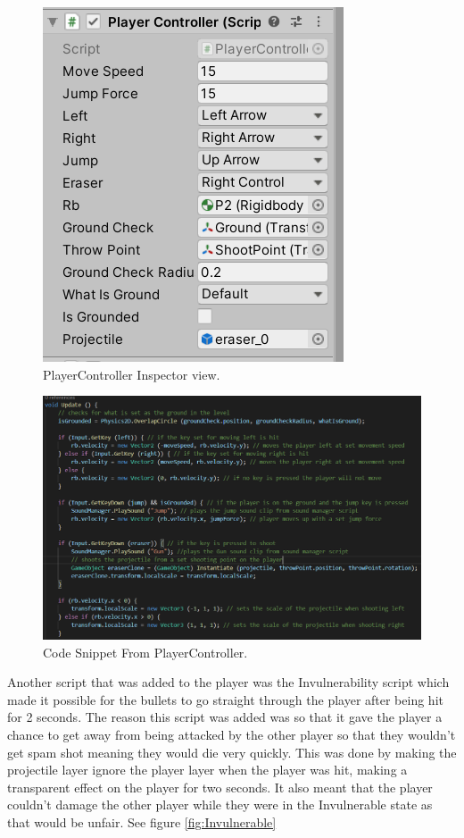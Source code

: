 \begin{figure}[h]
\centering
  \includegraphics[width= 0.4\linewidth]{Images/PlayerControllerInspector.PNG}
  \caption{PlayerController Inspector view.}
  \label{fig:PlayerInspect}
  \end{figure}
\begin{figure}[h]
\centering
  \includegraphics[width= 0.9\linewidth]{Images/PlayerController.PNG}
  \caption{Code Snippet From PlayerController.}
  \label{fig:PlayerControllerCode}
\end{figure}

Another script that was added to the player was the Invulnerability script which made it possible for the bullets to go straight through the player after being hit for 2 seconds. The reason this script was added was so that it gave the player a chance to get away from being attacked by the other player so that they wouldn't get spam shot meaning they would die very quickly. This was done by making the projectile layer ignore the player layer when the player was hit, making a transparent effect on the player for two seconds. It also meant that the player couldn't damage the other player while they were in the Invulnerable state as that would be unfair. See figure \ref{fig:Invulnerable}

